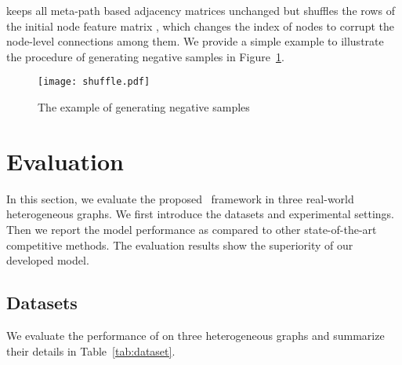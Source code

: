 \documentclass[conference]{IEEEtran}
\begin{document}
keeps all meta-path based adjacency matrices unchanged but shuffles the rows of the initial node feature matrix , which changes the index of nodes to corrupt the node-level connections among them. 
	We provide a simple example to illustrate the procedure of generating negative samples in Figure~\ref{fig:shuffle}.
\begin{figure}[t]
\centering
		\begin{minipage}[l]{1\columnwidth}
			\centering
			\texttt{[image: shuffle.pdf]}
		\end{minipage}
\caption{The example of generating negative samples}\label{fig:shuffle}
\end{figure}


	


	\section{Evaluation}\label{sec:real-eval}


In this section, we evaluate the proposed \our\ framework in three real-world heterogeneous graphs. We first introduce the datasets and experimental settings. Then we report the model performance as compared to other state-of-the-art competitive methods. The evaluation results show the superiority of our developed model.
	
	
	\subsection{Datasets}
We evaluate the performance of {\our} on three heterogeneous graphs and summarize their details in Table~\ref{tab:dataset}. 
	
\end{document}
